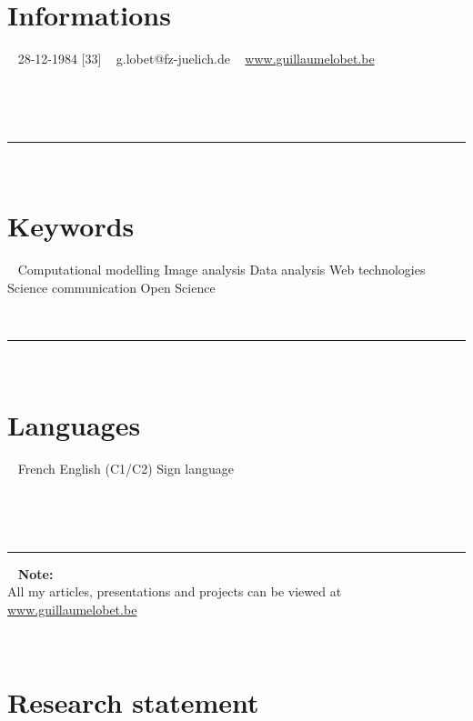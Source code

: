 \documentclass[]{friggeri-cv} %
\begin{document}



\thispagestyle{first}

\begin{aside} 
~\vspace{70pt}


\section{Informations}
~
28-12-1984 [33]
~
g.lobet@fz-juelich.de
~
\href{http://www.guillaumelobet.be}{www.guillaumelobet.be}

~

~\rule{\linewidth}{0.5pt}


~
\section{Keywords}
~
Computational modelling
Image analysis
Data analysis
Web technologies
Science communication
Open Science
~

~\rule{\linewidth}{0.5pt}

~
\section{Languages}
~
French {\color{light}}
English (C1/C2) {\color{light}}
Sign language {\color{light}}


~

~\rule{\linewidth}{0.5pt}
~
\textbf{Note:}\\ All my articles, presentations and projects can be viewed at \href{http://www.guillaumelobet.be}{www.guillaumelobet.be}

\end{aside}



~\vspace{5pt}
\section{Research statement}
\end{document}
